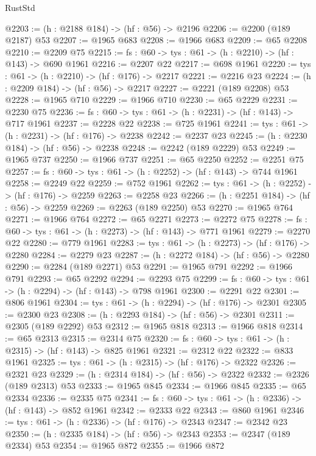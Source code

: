 \begin{lexlean}{RustStd}
\begin{coremodule}
@2203 := (h : @2188 @184) -> (hf : @56) -> @2196
@2206 := @2200 (@189 @2187) @53
@2207 := @1965 @683
@2208 := @1966 @683
@2209 := @65 @2208
@2210 := @2209 @75
@2215 := {fs : @60} -> {tys : @61} -> (h : @2210) -> (hf : @143) -> @690 @1961
@2216 := @2207 @22
@2217 := @698 @1961
@2220 := {tys : @61} -> (h : @2210) -> (hf : @176) -> @2217
@2221 := @2216 @23
@2224 := (h : @2209 @184) -> (hf : @56) -> @2217
@2227 := @2221 (@189 @2208) @53
@2228 := @1965 @710
@2229 := @1966 @710
@2230 := @65 @2229
@2231 := @2230 @75
@2236 := {fs : @60} -> {tys : @61} -> (h : @2231) -> (hf : @143) -> @717 @1961
@2237 := @2228 @22
@2238 := @725 @1961
@2241 := {tys : @61} -> (h : @2231) -> (hf : @176) -> @2238
@2242 := @2237 @23
@2245 := (h : @2230 @184) -> (hf : @56) -> @2238
@2248 := @2242 (@189 @2229) @53
@2249 := @1965 @737
@2250 := @1966 @737
@2251 := @65 @2250
@2252 := @2251 @75
@2257 := {fs : @60} -> {tys : @61} -> (h : @2252) -> (hf : @143) -> @744 @1961
@2258 := @2249 @22
@2259 := @752 @1961
@2262 := {tys : @61} -> (h : @2252) -> (hf : @176) -> @2259
@2263 := @2258 @23
@2266 := (h : @2251 @184) -> (hf : @56) -> @2259
@2269 := @2263 (@189 @2250) @53
@2270 := @1965 @764
@2271 := @1966 @764
@2272 := @65 @2271
@2273 := @2272 @75
@2278 := {fs : @60} -> {tys : @61} -> (h : @2273) -> (hf : @143) -> @771 @1961
@2279 := @2270 @22
@2280 := @779 @1961
@2283 := {tys : @61} -> (h : @2273) -> (hf : @176) -> @2280
@2284 := @2279 @23
@2287 := (h : @2272 @184) -> (hf : @56) -> @2280
@2290 := @2284 (@189 @2271) @53
@2291 := @1965 @791
@2292 := @1966 @791
@2293 := @65 @2292
@2294 := @2293 @75
@2299 := {fs : @60} -> {tys : @61} -> (h : @2294) -> (hf : @143) -> @798 @1961
@2300 := @2291 @22
@2301 := @806 @1961
@2304 := {tys : @61} -> (h : @2294) -> (hf : @176) -> @2301
@2305 := @2300 @23
@2308 := (h : @2293 @184) -> (hf : @56) -> @2301
@2311 := @2305 (@189 @2292) @53
@2312 := @1965 @818
@2313 := @1966 @818
@2314 := @65 @2313
@2315 := @2314 @75
@2320 := {fs : @60} -> {tys : @61} -> (h : @2315) -> (hf : @143) -> @825 @1961
@2321 := @2312 @22
@2322 := @833 @1961
@2325 := {tys : @61} -> (h : @2315) -> (hf : @176) -> @2322
@2326 := @2321 @23
@2329 := (h : @2314 @184) -> (hf : @56) -> @2322
@2332 := @2326 (@189 @2313) @53
@2333 := @1965 @845
@2334 := @1966 @845
@2335 := @65 @2334
@2336 := @2335 @75
@2341 := {fs : @60} -> {tys : @61} -> (h : @2336) -> (hf : @143) -> @852 @1961
@2342 := @2333 @22
@2343 := @860 @1961
@2346 := {tys : @61} -> (h : @2336) -> (hf : @176) -> @2343
@2347 := @2342 @23
@2350 := (h : @2335 @184) -> (hf : @56) -> @2343
@2353 := @2347 (@189 @2334) @53
@2354 := @1965 @872
@2355 := @1966 @872

\end{coremodule}
\end{lexlean}
